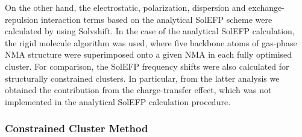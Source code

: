 \documentclass[a4paper,titlepage,twoside,fleqn,12pt]{book}
\begin{document}
\begin{appendices}
\begin{refsection}
On the other
hand, the electrostatic, polarization, dispersion and exchange\hyp{}repulsion
interaction terms based on the analytical SolEFP scheme
were calculated by using {\sc Solvshift}. In the
case of the analytical SolEFP calculation, the rigid molecule
algorithm \citep{Blasiak.Lee.Cho.JCP.2013} 
was used, where five backbone atoms of gas-phase
NMA structure were superimposed onto a given NMA
in each fully optimised cluster. For comparison, the SolEFP
frequency shifts were also calculated for structurally constrained
clusters. In particular, from the latter analysis we
obtained the contribution from the charge\hyp{}transfer effect,
which was not implemented in the analytical SolEFP calculation
procedure. 

\subsubsection{Constrained Cluster Method\label{a:constrained-models}}


\end{refsection}
\end{appendices}
\end{document}
